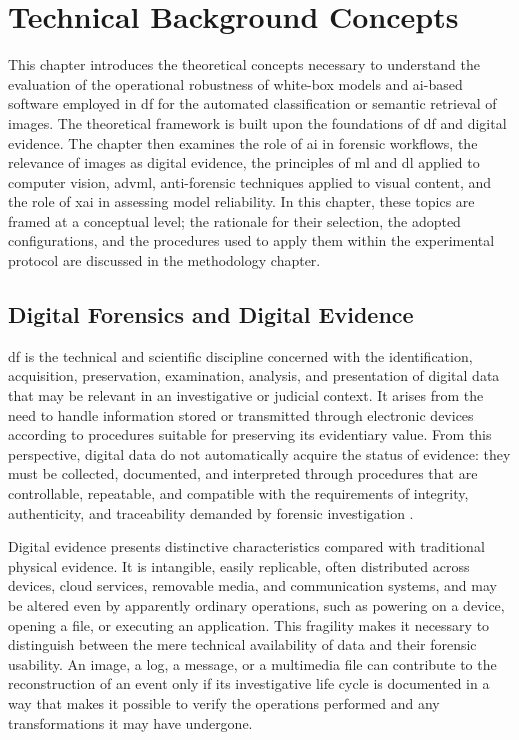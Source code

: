 \chapter{Technical Background Concepts}\label{chap:background}
This chapter introduces the theoretical concepts necessary to understand the
evaluation of the operational robustness of white-box models and \gls{ai}-based
software employed in \gls{df} for the automated classification or semantic
retrieval of images. The theoretical framework is built upon the foundations
of \gls{df} and digital evidence. The chapter then examines the role of
\gls{ai} in forensic workflows, the relevance of images as digital evidence,
the principles of \gls{ml} and \gls{dl} applied to computer vision,
\gls{advml}, anti-forensic techniques applied to visual content, and
the role of \gls{xai} in assessing model reliability. In this chapter, these
topics are framed at a conceptual level; the rationale for their selection, the
adopted configurations, and the procedures used to apply them within the
experimental protocol are discussed in the methodology chapter.

\section{Digital Forensics and Digital Evidence}
\label{sec:background_df_evidence}
\gls{df} is the technical and scientific discipline concerned with the
identification, acquisition, preservation, examination, analysis, and
presentation of digital data that may be relevant in an investigative or
judicial context. It arises from the need to handle information stored or
transmitted through electronic devices according to procedures suitable for
preserving its evidentiary value. From this perspective, digital data do not
automatically acquire the status of evidence: they must be collected,
documented, and interpreted through procedures that are controllable,
repeatable, and compatible with the requirements of integrity, authenticity,
and traceability demanded by forensic investigation
\cite{casey2011digital,garfinkel2010digital,nist2006guide,iso27041}.

Digital evidence presents distinctive characteristics compared with
traditional physical evidence. It is intangible, easily replicable, often
distributed across devices, cloud services, removable media, and communication
systems, and may be altered even by apparently ordinary operations, such as
powering on a device, opening a file, or executing an application. This
fragility makes it necessary to distinguish between the mere technical
availability of data and their forensic usability. An image, a log, a message,
or a multimedia file can contribute to the reconstruction of an event only if
its investigative life cycle is documented in a way that makes it possible to
verify the operations performed and any transformations it may have undergone.


